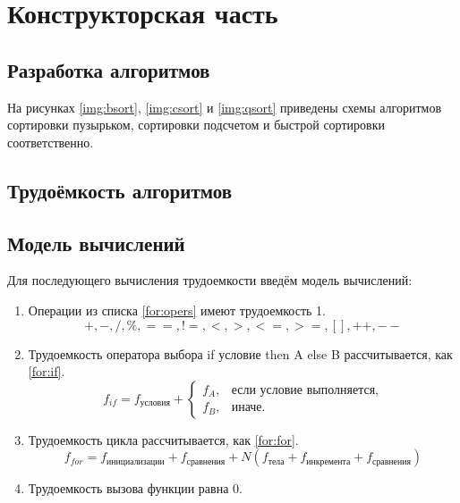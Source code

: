 \chapter{Конструкторская часть}

\section{Разработка алгоритмов}

На рисунках \ref{img:bsort}, \ref{img:csort} и \ref{img:qsort} приведены схемы алгоритмов сортировки пузырьком,
сортировки подсчетом и быстрой сортировки соответственно.

\section{Трудоёмкость алгоритмов}

\section{Модель вычислений}

Для последующего вычисления трудоемкости введём модель вычислений:

\begin{enumerate}
    \item Операции из списка \eqref{for:opers} имеют трудоемкость 1.
    \begin{equation}
        \label{for:opers}
        +, -, /, \%, ==, !=, <, >, <=, >=, [], ++, {-}-
    \end{equation}
    \item Трудоемкость оператора выбора if условие then A else B рассчитывается, как \eqref{for:if}.
    \begin{equation}
        \label{for:if}
        f_{if} = f_{\text{условия}} +
        \begin{cases}
            f_A, & \text{если условие выполняется,}\\
            f_B, & \text{иначе.}
        \end{cases}
    \end{equation}
    \item Трудоемкость цикла рассчитывается, как \eqref{for:for}.
    \begin{equation}
        \label{for:for}
        f_{for} = f_{\text{инициализации}} + f_{\text{сравнения}} + N(f_{\text{тела}} + f_{\text{инкремента}} + f_{\text{сравнения}})
    \end{equation}
    \item Трудоемкость вызова функции равна 0.
\end{enumerate}

